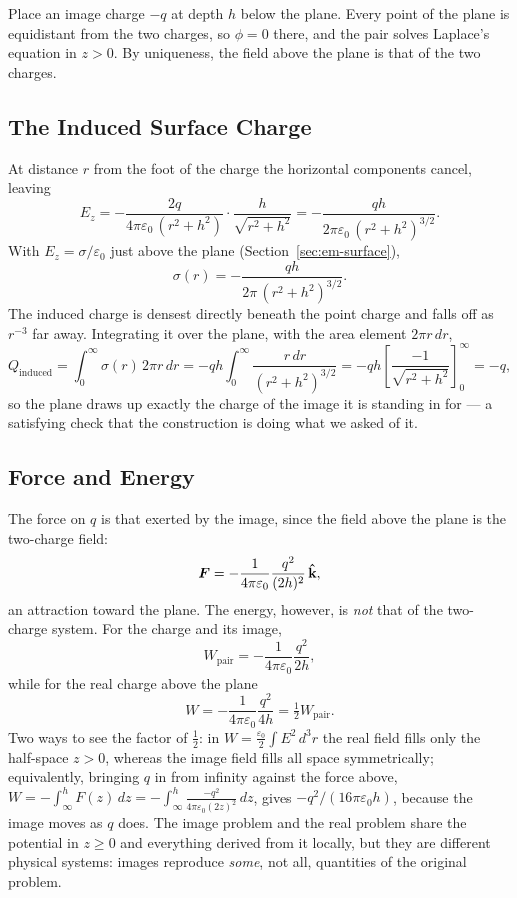 Place an image charge $-q$ at depth $h$ below the plane. Every point of the plane is equidistant from the two charges, so $\phi=0$ there, and the pair solves Laplace's equation in $z>0$. By uniqueness, the field above the plane is that of the two charges.

\subsection{The Induced Surface Charge}

At distance $r$ from the foot of the charge the horizontal components cancel, leaving
\[
    E_z = -\frac{2q}{4\pi\varepsilon_0\,(r^2+h^2)}\cdot\frac{h}{\sqrt{r^2+h^2}} = -\frac{qh}{2\pi\varepsilon_0\,(r^2+h^2)^{3/2}} .
\]
With $E_z = \sigma/\varepsilon_0$ just above the plane (Section~\ref{sec:em-surface}),
\[
    \sigma(r) = -\frac{qh}{2\pi\,(r^2+h^2)^{3/2}} .
\]
The induced charge is densest directly beneath the point charge and falls off as $r^{-3}$ far away. Integrating it over the plane, with the area element $2\pi r\,dr$,
\[
    Q_\text{induced} = \int_0^\infty \sigma(r)\,2\pi r\,dr
    = -qh\int_0^\infty \frac{r\,dr}{(r^2+h^2)^{3/2}}
    = -qh\left[\frac{-1}{\sqrt{r^2+h^2}}\right]_0^\infty = -q ,
\]
so the plane draws up exactly the charge of the image it is standing in for --- a satisfying check that the construction is doing what we asked of it.

\subsection{Force and Energy}

The force on $q$ is that exerted by the image, since the field above the plane is the two-charge field:
\[
    \vect{F} = -\frac{1}{4\pi\varepsilon_0}\frac{q^2}{(2h)^2}\,\khat ,
\]
an attraction toward the plane. The energy, however, is \emph{not} that of the two-charge system. For the charge and its image,
\[
    W_\text{pair} = -\frac{1}{4\pi\varepsilon_0}\frac{q^2}{2h},
\]
while for the real charge above the plane
\[
    W = -\frac{1}{4\pi\varepsilon_0}\frac{q^2}{4h} = \tfrac12 W_\text{pair}.
\]
Two ways to see the factor of $\tfrac12$: in $W = \frac{\varepsilon_0}{2}\int E^2\,d^3r$ the real field fills only the half-space $z>0$, whereas the image field fills all space symmetrically; equivalently, bringing $q$ in from infinity against the force above, $W = -\int_\infty^h F(z)\,dz = -\int_\infty^h \frac{-q^2}{4\pi\varepsilon_0(2z)^2}\,dz$, gives $-q^2/(16\pi\varepsilon_0 h)$, because the image moves as $q$ does. The image problem and the real problem share the potential in $z\ge0$ and everything derived from it locally, but they are different physical systems: images reproduce \emph{some}, not all, quantities of the original problem.

